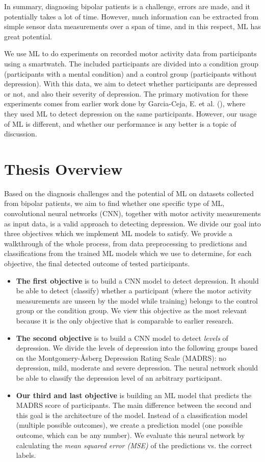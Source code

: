 In summary, diagnosing bipolar patients is a challenge, errors are made, and it potentially takes a lot of time. However, much information can be extracted from simple sensor data measurements over a span of time, and in this respect, ML has great potential. 

We use ML to do experiments on recorded motor activity data from participants using a smartwatch. The included participants are divided into a condition group (participants with a mental condition) and a control group (participants without depression). With this data, we aim to detect whether participants are depressed or not, and also their severity of depression. The primary motivation for these experiments comes from earlier work done by Garcia-Ceja, E. et al. (\cite{GarciaCeja2018_classification_bipolar}), where they used ML to detect depression on the same participants. However, our usage of ML is different, and whether our performance is any better is a topic of discussion.

\section{Thesis Overview}
Based on the diagnosis challenges and the potential of ML on datasets collected from bipolar patients, we aim to find whether one specific type of ML, convolutional neural networks (CNN), together with motor activity measurements as input data, is a valid approach to detecting depression. We divide our goal into three objectives which we implement ML models to satisfy. We provide a walkthrough of the whole process, from data preprocessing to predictions and classifications from the trained ML models which we use to determine, for each objective, the final detected outcome of tested participants.

\begin{itemize}
    \item \textbf{The first objective} is to build a CNN model to detect depression. It should be able to detect (classify) whether a participant (where the motor activity measurements are unseen by the model while training) belongs to the control group or the condition group. We view this objective as the most relevant because it is the only objective that is comparable to earlier research.
    \item \textbf{The second objective} is to build a CNN model to detect \textit{levels} of depression. We divide the levels of depression into the following groups based on the Montgomery-Åsberg Depression Rating Scale (MADRS): no depression, mild, moderate and severe depression. The neural network should be able to classify the depression level of an arbitrary participant.
    \item \textbf{Our third and last objective} is building an ML model that predicts the MADRS score of participants. The main difference between the second and this goal is the architecture of the model. Instead of a classification model (multiple possible outcomes), we create a prediction model (one possible outcome, which can be any number). We evaluate this neural network by calculating the \textit{mean squared error (MSE)} of the predictions vs. the correct labels.
\end{itemize}

